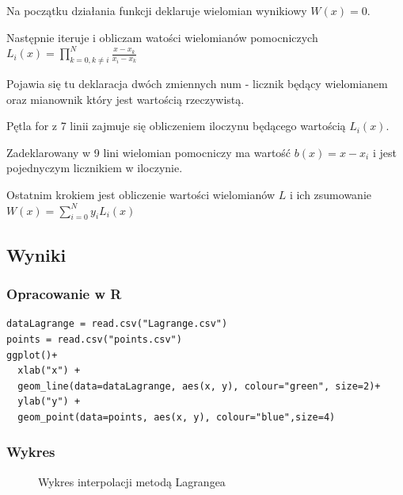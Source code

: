 \documentclass{article}
\begin{document}
    Na początku działania funkcji deklaruje wielomian wynikiowy $W(x)=0$.
    
    Następnie iteruje i obliczam watości wielomianów pomocniczych $L_i(x)=\prod^{N}_{k=0, k\neq i}\frac{x-x_k}{x_i-x_k}$

    Pojawia się tu deklaracja dwóch zmiennych num - licznik będący wielomianem oraz mianownik który jest wartością rzeczywistą.

    Pętla for z 7 linii zajmuje się obliczeniem iloczynu będącego wartością $L_i(x)$.

    Zadeklarowany w 9 lini wielomian pomocniczy ma wartość $b(x)=x-x_i$ i jest pojednyczym licznikiem w iloczynie.

    Ostatnim krokiem jest obliczenie wartości wielomianów $L$ i ich zsumowanie $W(x)=\sum^N_{i=0}y_iL_i(x)$

    \vspace{5px}

    \subsection{Wyniki}
    \subsubsection{Opracowanie w R}
    \lstset {language=R}
    \begin{lstlisting}[caption={Rysowanie wykresu wielomianu}]
dataLagrange = read.csv("Lagrange.csv")
points = read.csv("points.csv")
ggplot()+
  xlab("x") +
  geom_line(data=dataLagrange, aes(x, y), colour="green", size=2)+
  ylab("y") +
  geom_point(data=points, aes(x, y), colour="blue",size=4)
    \end{lstlisting}
    \subsubsection{Wykres}
    \begin{figure}[h]
        \caption{\label{fig:lagrangePlot} Wykres interpolacji metodą Lagrangea}
    \end{figure}
\end{document}
